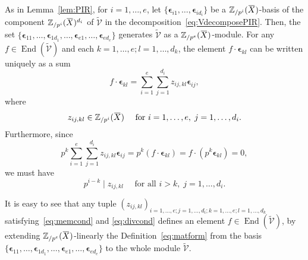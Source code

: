 \documentclass[letterpaper, 11pt, thm-restate]{article}
\numberwithin{equation}{section}
\newcommand{\Z}{\mathbb{Z}}
\newcommand{\Zpe}{\mathbb{Z}_{/p^e}}
\newcommand{\Zpi}{\mathbb{Z}_{/p^i}}
\newcommand{\End}{\operatorname{End}}
\newcommand{\bepsilon}{\boldsymbol{\epsilon}}
\newcommand{\tmV}{\widetilde{\mathcal{V}}}
\newcommand{\oX}{\mkern 1.5mu\overline{\mkern-1.5mu X \mkern-1.5mu}\mkern 1.5mu}
\theoremstyle{definition}
\theoremstyle{definition}
\theoremstyle{definition}
\begin{document}
As in Lemma~\ref{lem:PIR}, for $i = 1, \ldots, e$, let $\{\bepsilon_{i1}, \ldots, \bepsilon_{i d_i}\}$ be a $\Zpi(\oX)$-basis of the component $\Zpi(\oX)^{d_i}$ of $\tmV$ in the decomposition~\eqref{eq:VdecomposePIR}.
Then, the set $\{\bepsilon_{11}, \ldots, \bepsilon_{1 d_1}, \ldots, \bepsilon_{e1}, \ldots, \bepsilon_{e d_e}\}$ generates $\tmV$ as a $\Zpe(\oX)$-module.
For any $f \in \End(\tmV)$ and each $k = 1, \ldots, e; l = 1, \ldots, d_k$, the element $f \cdot \bepsilon_{k l}$ can be written uniquely as a sum
\begin{equation}\label{eq:matform}
f \cdot \bepsilon_{k l} = \sum_{i = 1}^e \sum_{j = 1}^{d_i} z_{ij, kl} \bepsilon_{ij},
\end{equation}
where 
\begin{equation}\label{eq:memcond}
    z_{ij, kl} \in \Z_{/p^i}(\oX) \quad \text{ for } i = 1, \ldots, e,\; j = 1, \ldots, d_i.
\end{equation}
Furthermore, since 
\[
p^{k} \sum_{i = 1}^e \sum_{j = 1}^{d_i} z_{ij, kl} \bepsilon_{ij} = p^{k} (f \cdot \bepsilon_{kl}) = f \cdot (p^k \bepsilon_{kl}) = 0,
\]
we must have 
\begin{equation}\label{eq:divcond}
    p^{i - k} \mid z_{ij, kl} \quad \text{ for all } i > k,\; j = 1, \ldots, d_i.
\end{equation}

It is easy to see that any tuple $\left(z_{ij, kl}\right)_{i = 1, \ldots, e; j = 1, \ldots, d_i; k = 1, \ldots, e; l = 1, \ldots, d_k}$ satisfying~\eqref{eq:memcond} and \eqref{eq:divcond} defines an element $f \in \End(\tmV)$, by extending $\Zpe(\oX)$-linearly the Definition~\eqref{eq:matform} from the basis $\{\bepsilon_{11}, \ldots, \bepsilon_{1 d_1}, \ldots, \bepsilon_{e1}, \ldots, \bepsilon_{e d_e}\}$ to the whole module $\tmV$.
\end{document}

